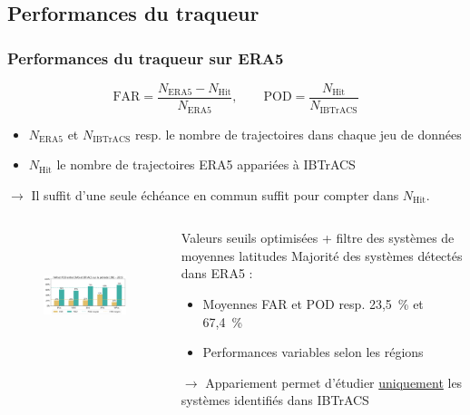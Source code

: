 \documentclass[aspectratio=169, usepdftitle=false, xcolor={dvipsnames}, 9pt,table]{beamer}
\begin{document}
\subsection*{Performances du traqueur}
\begin{frame}[t]
    \frametitle{Performances du traqueur sur ERA5}
    \footnotesize
    \begin{examples}    
        \scriptsize
        \[ \text{FAR} = \frac{N_{\text{ERA5}} - N_{\text{Hit}}}{N_{\text{ERA5}}}, \quad\quad \text{POD} = \frac{N_{\text{Hit}}}{N_{\text{IBTrACS}}} \]
        \setlength{\leftmargini}{2.5ex}
        \begin{itemize}
            \item $N_{\text{ERA5}}$ et $N_{\text{IBTrACS}}$ resp. le nombre de trajectoires dans chaque jeu de données
            \item $N_{\text{Hit}}$ le nombre de trajectoires ERA5 appariées à IBTrACS
        \end{itemize}
        $\longrightarrow$ Il suffit \alert{d'une seule échéance} en commun suffit pour compter dans $N_{\text{Hit}}$.
    \end{examples}
    \pause
    \begin{columns}
        \begin{column}{0.6\textwidth}
        \footnotesize
        \vspace{-0.5em}
        \begin{figure}
            \centering
            \includegraphics[height=3.8cm]{Figures/far_pod.png}
        \end{figure}
        \end{column}
        \begin{column}{0.4\linewidth}
        \scriptsize
        \vspace{-1em}
        \begin{block}        
            Valeurs seuils optimisées + filtre des systèmes de moyennes latitudes \parencite{hart_cyclone_2003}
            \tcblower
            \setlength{\leftmargini}{2.5ex}
            \alert{Majorité} des systèmes détectés dans ERA5 :
            \begin{itemize}
                \item Moyennes FAR et POD resp. 23,5~\% et 67,4~\%
                \item Performances variables selon les régions
            \end{itemize}
            $\longrightarrow$ Appariement permet d'étudier \underline{uniquement} les \alert{\mbox{systèmes} identifiés} dans IBTrACS
        \end{block}
        \end{column}
    \end{columns}
\end{frame}
\end{document}
